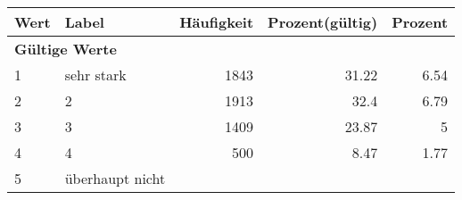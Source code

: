      \begin{longtable}{lXrrr}
     \toprule
     \textbf{Wert} & \textbf{Label} & \textbf{Häufigkeit} & \textbf{Prozent(gültig)} & \textbf{Prozent} \\
     \endhead
     \midrule
     \multicolumn{5}{l}{\textbf{Gültige Werte}}\\

     1 &
     \multicolumn{1}{X}{ sehr stark   } &


       \num{1843} &
       \num[round-mode=places,round-precision=2]{31,22} &
         \num[round-mode=places,round-precision=2]{6,54} \\

     2 &
     \multicolumn{1}{X}{ 2   } &


       \num{1913} &
       \num[round-mode=places,round-precision=2]{32,4} &
         \num[round-mode=places,round-precision=2]{6,79} \\

     3 &
     \multicolumn{1}{X}{ 3   } &


       \num{1409} &
       \num[round-mode=places,round-precision=2]{23,87} &
         \num[round-mode=places,round-precision=2]{5} \\

     4 &
     \multicolumn{1}{X}{ 4   } &


       \num{500} &
       \num[round-mode=places,round-precision=2]{8,47} &
         \num[round-mode=places,round-precision=2]{1,77} \\

     5 &
     \multicolumn{1}{X}{ überhaupt nicht   } &



\end{longtable}
